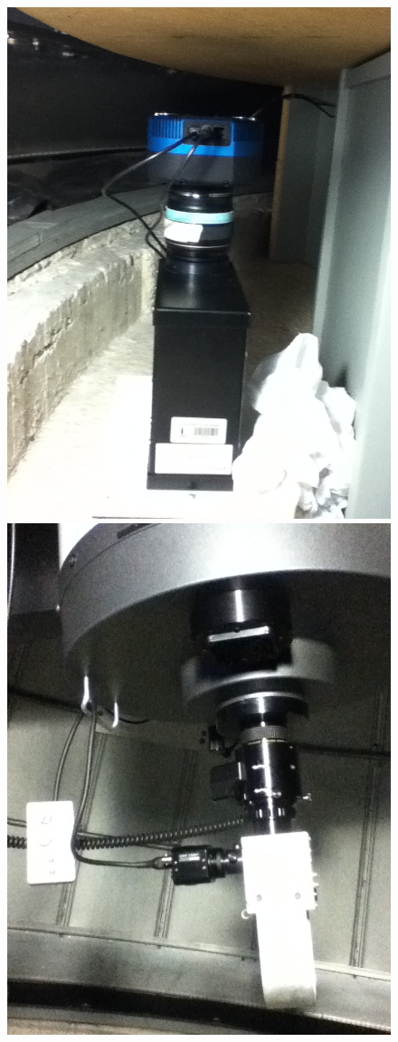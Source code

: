 \documentclass[Proceedings]{ascelike}
\begin{document}
\begin{figure}
\centering
\includegraphics[scale=0.2]{espectroscopio.jpg}
\includegraphics[scale=0.2]{montaje.jpg}


\end{figure}
\end{document}
